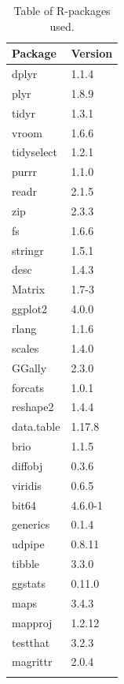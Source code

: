 \begin{longtable}{p{2.5cm}p{2.5cm}}
  \toprule
Package & Version \\ 
  \midrule
dplyr & 1.1.4 \\ 
  plyr & 1.8.9 \\ 
  tidyr & 1.3.1 \\ 
  vroom & 1.6.6 \\ 
  tidyselect & 1.2.1 \\ 
  purrr & 1.1.0 \\ 
  readr & 2.1.5 \\ 
  zip & 2.3.3 \\ 
  fs & 1.6.6 \\ 
  stringr & 1.5.1 \\ 
  desc & 1.4.3 \\ 
  Matrix & 1.7-3 \\ 
  ggplot2 & 4.0.0 \\ 
  rlang & 1.1.6 \\ 
  scales & 1.4.0 \\ 
  GGally & 2.3.0 \\ 
  forcats & 1.0.1 \\ 
  reshape2 & 1.4.4 \\ 
  data.table & 1.17.8 \\ 
  brio & 1.1.5 \\ 
  diffobj & 0.3.6 \\ 
  viridis & 0.6.5 \\ 
  bit64 & 4.6.0-1 \\ 
  generics & 0.1.4 \\ 
  udpipe & 0.8.11 \\ 
  tibble & 3.3.0 \\ 
  ggstats & 0.11.0 \\ 
  maps & 3.4.3 \\ 
  mapproj & 1.2.12 \\ 
  testthat & 3.2.3 \\ 
  magrittr & 2.0.4 \\ 
   \bottomrule
\caption{Table of R-packages used.} 
\label{r_package_table}
\end{longtable}
